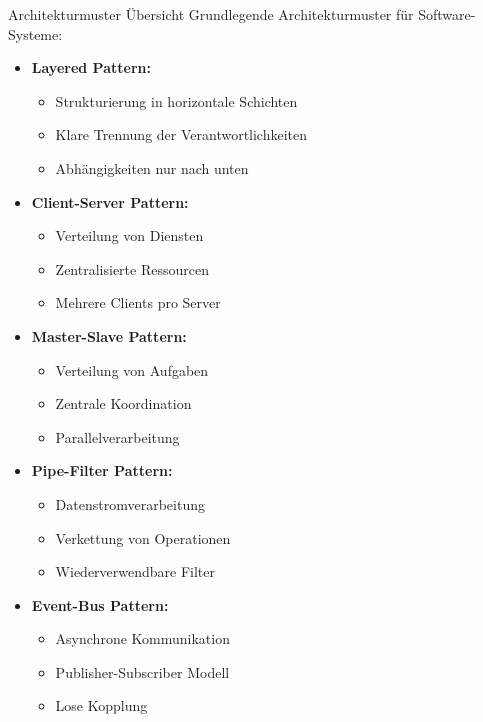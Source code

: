 \begin{concept}{Architekturmuster Übersicht}
Grundlegende Architekturmuster für Software-Systeme:

\begin{itemize}
    \item \textbf{Layered Pattern:} 
    \begin{itemize}
        \item Strukturierung in horizontale Schichten
        \item Klare Trennung der Verantwortlichkeiten
        \item Abhängigkeiten nur nach unten
    \end{itemize}
    
    \item \textbf{Client-Server Pattern:}
    \begin{itemize}
        \item Verteilung von Diensten
        \item Zentralisierte Ressourcen
        \item Mehrere Clients pro Server
    \end{itemize}
    
    \item \textbf{Master-Slave Pattern:}
    \begin{itemize}
        \item Verteilung von Aufgaben
        \item Zentrale Koordination
        \item Parallelverarbeitung
    \end{itemize}
    
    \item \textbf{Pipe-Filter Pattern:}
    \begin{itemize}
        \item Datenstromverarbeitung
        \item Verkettung von Operationen
        \item Wiederverwendbare Filter
    \end{itemize}
    
    \item \textbf{Event-Bus Pattern:}
    \begin{itemize}
        \item Asynchrone Kommunikation
        \item Publisher-Subscriber Modell
        \item Lose Kopplung
    \end{itemize}
\end{itemize}
\end{concept}

